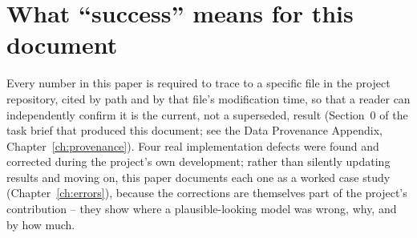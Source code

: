 \documentclass[11pt]{report}
\begin{document}
\section{What ``success'' means for this document}
Every number in this paper is required to trace to a specific file in the project
repository, cited by path and by that file's modification time, so that a reader can
independently confirm it is the current, not a superseded, result (Section~0 of the
task brief that produced this document; see the Data Provenance Appendix,
Chapter~\ref{ch:provenance}). Four real implementation defects were found and corrected
during the project's own development; rather than silently updating results and moving
on, this paper documents each one as a worked case study (Chapter~\ref{ch:errors}),
because the corrections are themselves part of the project's contribution -- they show
where a plausible-looking model was wrong, why, and by how much.


























\end{document}
